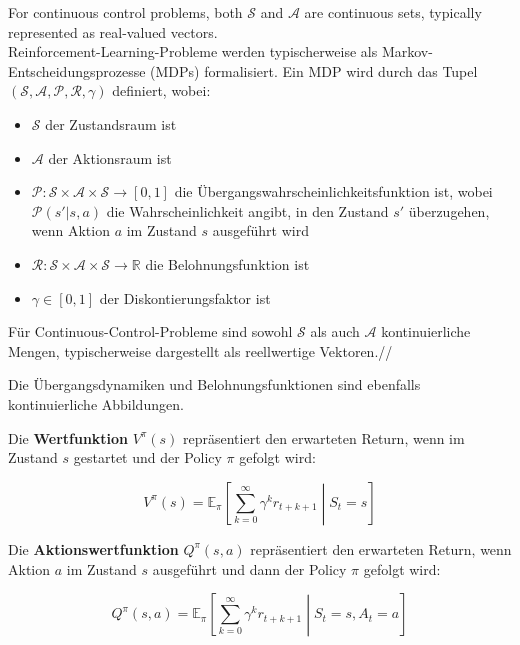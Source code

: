 \noindent For continuous control problems, both $\mathcal{S}$ and $\mathcal{A}$ are continuous sets, typically represented as real-valued vectors.\\


Reinforcement-Learning-Probleme werden typischerweise als Markov-Entscheidungsprozesse (MDPs) formalisiert. Ein MDP wird durch das Tupel $(\mathcal{S}, \mathcal{A}, \mathcal{P}, \mathcal{R}, \gamma)$ definiert, wobei:

\begin{itemize}
    \item $\mathcal{S}$ der Zustandsraum ist
    \item $\mathcal{A}$ der Aktionsraum ist
    \item $\mathcal{P}: \mathcal{S} \times \mathcal{A} \times \mathcal{S} \rightarrow [0,1]$ die Übergangswahrscheinlichkeitsfunktion ist, wobei $\mathcal{P}(s'|s,a)$ die Wahrscheinlichkeit angibt, in den Zustand $s'$ überzugehen, wenn Aktion $a$ im Zustand $s$ ausgeführt wird
    \item $\mathcal{R}: \mathcal{S} \times \mathcal{A} \times \mathcal{S} \rightarrow \mathbb{R}$ die Belohnungsfunktion ist
    \item $\gamma \in [0,1]$ der Diskontierungsfaktor ist
\end{itemize}

Für Continuous-Control-Probleme sind sowohl $\mathcal{S}$ als auch $\mathcal{A}$ kontinuierliche Mengen, typischerweise dargestellt als reellwertige Vektoren.//

Die Übergangsdynamiken und Belohnungsfunktionen sind ebenfalls kontinuierliche Abbildungen.

Die \textbf{Wertfunktion} $V^\pi(s)$ repräsentiert den erwarteten Return, wenn im Zustand $s$ gestartet und der Policy $\pi$ gefolgt wird:

\begin{equation}
V^\pi(s) = \mathbb{E}_\pi\left[\sum_{k=0}^{\infty} \gamma^k r_{t+k+1} \middle| S_t = s\right]
\end{equation}

Die \textbf{Aktionswertfunktion} $Q^\pi(s,a)$ repräsentiert den erwarteten Return, wenn Aktion $a$ im Zustand $s$ ausgeführt und dann der Policy $\pi$ gefolgt wird:

\begin{equation}
Q^\pi(s,a) = \mathbb{E}_\pi\left[\sum_{k=0}^{\infty} \gamma^k r_{t+k+1} \middle| S_t = s, A_t = a\right]
\end{equation}

